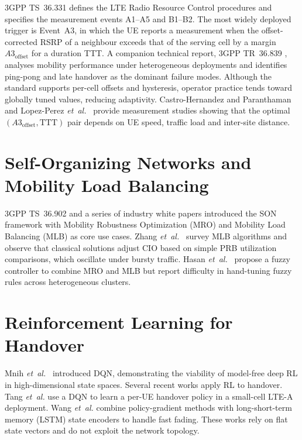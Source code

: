 \documentclass[12pt,a4paper,oneside]{report}
\begin{document}
3GPP TS~36.331 \cite{ts36331} defines the LTE Radio Resource Control
procedures and specifies the measurement events A1--A5 and B1--B2. The
most widely deployed trigger is Event~A3, in which the UE reports a
measurement when the offset-corrected RSRP of a neighbour exceeds that
of the serving cell by a margin $A3_{\text{offset}}$ for a duration
TTT. A companion technical report, 3GPP TR~36.839 \cite{3gpp_36839},
analyses mobility performance under heterogeneous deployments and
identifies ping-pong and late handover as the dominant failure modes.
Although the standard supports per-cell offsets and hysteresis, operator
practice tends toward globally tuned values, reducing adaptivity.
Castro-Hernandez and Paranthaman \cite{castro_handover_2014} and
Lopez-Perez \textit{et~al.}~\cite{lopezperez_mobility_2012} provide
measurement studies showing that the optimal
$(A3_{\text{offset}}, \text{TTT})$ pair depends on UE speed, traffic
load and inter-site distance.

\section{Self-Organizing Networks and Mobility Load Balancing}

3GPP TS~36.902 \cite{ts36902} and a series of industry white papers
introduced the SON framework with Mobility Robustness Optimization (MRO)
and Mobility Load Balancing (MLB) as core use cases. Zhang
\textit{et~al.}~\cite{zhang_mlb_2021} survey MLB algorithms and observe
that classical solutions adjust CIO based on simple PRB utilization
comparisons, which oscillate under bursty traffic. Hasan
\textit{et~al.}~\cite{hasan_son_2020} propose a fuzzy controller to
combine MRO and MLB but report difficulty in hand-tuning fuzzy rules
across heterogeneous clusters.

\section{Reinforcement Learning for Handover}

Mnih \textit{et~al.}~\cite{mnih_dqn_2015} introduced DQN, demonstrating
the viability of model-free deep RL in high-dimensional state spaces.
Several recent works apply RL to handover. Tang \textit{et~al.}
\cite{tang_handover_drl} use a DQN to learn a per-UE handover policy in
a small-cell LTE-A deployment. Wang \textit{et~al.}
\cite{wang_handover_drl_2022} combine policy-gradient methods with
long-short-term memory (LSTM) state encoders to handle fast fading.
These works rely on flat state vectors and do not exploit the network
topology.
\end{document}
